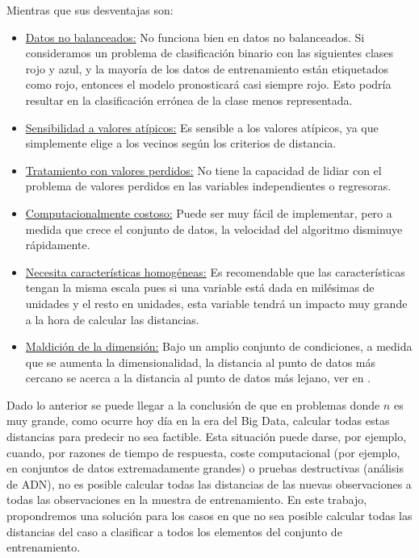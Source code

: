 \documentclass[12pt]{report} %
\theoremstyle{definition}
\begin{document}
\noindent Mientras que sus desventajas son:

\begin{itemize}
	\item \underline{Datos no balanceados:} No funciona bien en datos no balanceados. Si consideramos un problema de clasificación binario con las siguientes clases rojo y azul, y la mayoría de los datos de entrenamiento están etiquetados como rojo, entonces el modelo pronosticará casi siempre rojo. Esto podría resultar en la clasificación errónea de la clase menos representada.
	\item \underline{Sensibilidad a valores atípicos:} Es sensible a los valores atípicos, ya que simplemente elige a los vecinos según los criterios de distancia.
	\item \underline{Tratamiento con valores perdidos:} No tiene la capacidad de lidiar con el problema de valores perdidos en las variables independientes o regresoras.
	\item \underline{Computacionalmente costoso:} Puede ser muy fácil de implementar, pero a medida que crece el conjunto de datos, la velocidad del algoritmo disminuye rápidamente.
	\item \underline{Necesita características homogéneas:} Es recomendable que las características tengan la misma escala pues si una variable está dada en milésimas de unidades y el resto en unidades, esta variable tendrá un impacto muy grande a la hora de calcular las distancias.
	\item \underline{Maldición de la dimensión:} Bajo un amplio conjunto de condiciones, a medida que se aumenta la dimensionalidad, la distancia al punto de datos más cercano se acerca a la distancia al punto de datos más lejano, ver en \cite{knnMeaningful}.
\end{itemize}

Dado lo anterior se puede llegar a la conclusión de que en problemas donde $n$ es muy grande, como ocurre hoy día en la era del Big Data, calcular todas estas distancias para predecir no sea factible. Esta situación puede darse, por ejemplo, cuando, por razones de tiempo de respuesta, coste computacional (por ejemplo, en conjuntos de datos extremadamente grandes) o pruebas destructivas (análisis de ADN), no es posible calcular todas las distancias de las nuevas observaciones a todas las observaciones en la muestra de entrenamiento. En este trabajo, propondremos una solución para los casos en que no sea posible calcular todas las distancias del caso a clasificar a todos los elementos del conjunto de entrenamiento.
\end{document}
